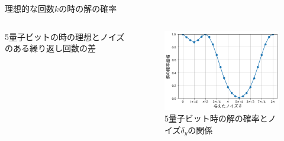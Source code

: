 \documentclass[platex,dvipdfmx]{beamer}			%
\begin{document}
\begin{frame}{理想的な回数$k$の時の解の確率}
    \begin{columns}[onlytextwidth]
        \begin{column}{.45\textwidth}
            5量子ビットの時の理想とノイズのある繰り返し回数の差
        \end{column}
        \hfill
        \begin{column}{.60\textwidth}
        \begin{figure}
            \includegraphics[width=\textwidth]{figures/5qubits/p(k).png}
          \caption{5量子ビット時の解の確率とノイズ$\delta_y$の関係}
        \end{figure}
        \end{column}
        \end{columns}
\end{frame}

\end{document}
